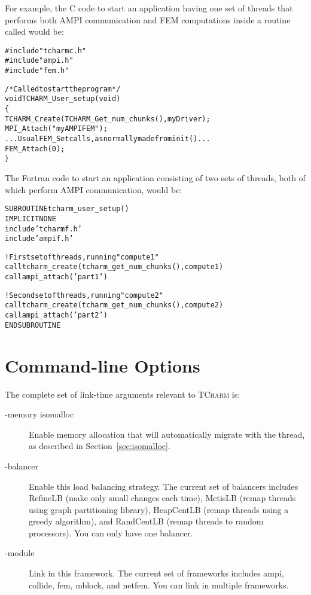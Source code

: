 \documentclass[10pt]{article}
\newcommand{\tcharm}{\textsc{TCharm}}
\begin{document}
For example, the C code to start an application having one set of threads
that performs both AMPI communication and FEM computations inside a 
routine called  would be:

\begin{alltt}
     #include "tcharmc.h"
     #include "ampi.h"
     #include "fem.h"
     
     /* Called to start the program */
     void TCHARM\_User\_setup(void)
     \{
         TCHARM\_Create(TCHARM\_Get\_num\_chunks(),myDriver);
         MPI\_Attach("myAMPIFEM");        
         ... Usual FEM_Set calls, as normally made from init() ...
         FEM\_Attach(0);
     \}
\end{alltt}

The Fortran code to start an application consisting of two sets of threads,
both of which perform AMPI communication, would be:

\begin{alltt}
     SUBROUTINE tcharm\_user\_setup()
       IMPLICIT NONE
       include 'tcharmf.h'
       include 'ampif.h'
       
    ! First set of threads, running "compute1"
       call tcharm\_create(tcharm\_get\_num\_chunks(),compute1)
       call ampi\_attach('part1')
       
    ! Second set of threads, running "compute2"
       call tcharm\_create(tcharm\_get\_num\_chunks(),compute2)
       call ampi\_attach('part2')
     END SUBROUTINE
\end{alltt}



\section{Command-line Options}
\label{sec:cla}

The complete set of link-time arguments relevant to \tcharm{} is:
\begin{description}
\item[-memory isomalloc] Enable memory allocation that will automatically
migrate with the thread, as described in Section~\ref{sec:isomalloc}.

\item[-balancer ] Enable this load balancing strategy.  The
current set of balancers  includes RefineLB (make only small changes
each time), MetisLB (remap threads using graph partitioning library), 
HeapCentLB (remap threads using a greedy algorithm), and RandCentLB
(remap threads to random processors).  You can only have one balancer.

\item[-module ] Link in this framework.  The current set of frameworks
 includes ampi, collide, fem, mblock, and netfem.  You can link in 
multiple frameworks.

\end{description}
\end{document}
